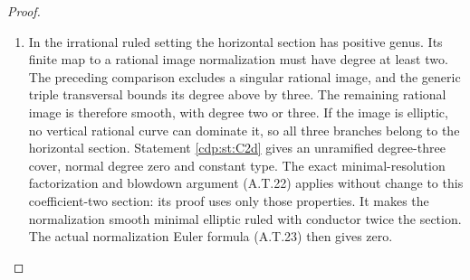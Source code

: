 \begin{proof}
\begin{enumerate}[label={$\langle1\rangle$\arabic*.},leftmargin=*]
\item In the irrational ruled setting the horizontal
section has positive genus. Its finite map to a
rational image normalization must have degree at
least two. The preceding comparison excludes a
singular rational image, and the generic triple
transversal bounds its degree above by three.
The remaining rational image is therefore smooth,
with degree two or three. If the image is elliptic,
no vertical rational curve can dominate it, so all
three branches belong to the horizontal section.
Statement \ref{cdp:st:C2d} gives an unramified degree-three
cover, normal degree zero and constant type.
The exact minimal-resolution factorization and
blowdown argument (A.T.22) applies without change
to this coefficient-two section: its proof uses
only those properties. It makes the normalization
smooth minimal elliptic ruled with conductor twice
the section. The actual normalization Euler formula
(A.T.23) then gives zero.

\end{enumerate}
\end{proof}
